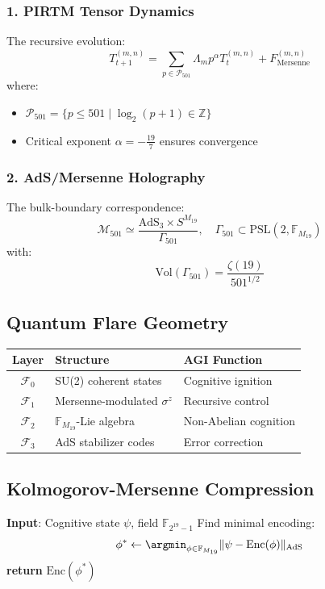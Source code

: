 \documentclass[12pt]{article}
\begin{document}
\subsubsection*{1. PIRTM Tensor Dynamics}
The recursive evolution:
\[
T_{t+1}^{(m,n)} = \sum_{p \in \mathcal{P}_{501}} \Lambda_m p^\alpha T_t^{(m,n)} + F_{\text{Mersenne}}^{(m,n)}
\]
where:
\begin{itemize}
    \item $\mathcal{P}_{501} = \{p \leq 501 \mid \log_2(p+1) \in \mathbb{Z}\}$
    \item Critical exponent $\alpha = -\frac{19}{7}$ ensures convergence
\end{itemize}

\subsubsection*{2. AdS/Mersenne Holography}
The bulk-boundary correspondence:
\[
\mathcal{M}_{501} \simeq \frac{\text{AdS}_3 \times S^{M_{19}}}{\Gamma_{501}}, \quad \Gamma_{501} \subset \text{PSL}(2,\mathbb{F}_{M_{19}})
\]
with:
\[
\text{Vol}(\Gamma_{501}) = \frac{\zeta(19)}{501^{1/2}}
\]

\subsection*{Quantum Flare Geometry}
\begin{table}[h]
\centering
\begin{tabular}{cll}
\toprule
\textbf{Layer} & \textbf{Structure} & \textbf{AGI Function} \\
\midrule
$\mathcal{F}_0$ & SU(2) coherent states & Cognitive ignition \\
$\mathcal{F}_1$ & Mersenne-modulated $\sigma^z$ & Recursive control \\
$\mathcal{F}_2$ & $\mathbb{F}_{M_{19}}$-Lie algebra & Non-Abelian cognition \\
$\mathcal{F}_3$ & AdS stabilizer codes & Error correction \\
\bottomrule
\end{tabular}
\end{table}

\subsection*{Kolmogorov-Mersenne Compression}
\begin{algorithm}[H]
\caption{Quantum State Compression}
\begin{algorithmic}[1]
\State \textbf{Input}: Cognitive state $\psi$, field $\mathbb{F}_{2^{19}-1}$
\State Find minimal encoding:
\[
\phi^* \gets \argmin_{\phi \in \mathbb{F}_{M_{19}}} \|\psi - \text{Enc}(\phi)\|_{\text{AdS}}
\]
\State \textbf{return} $\text{Enc}(\phi^*)$ 
\end{algorithmic}
\end{algorithm}
\end{document}
